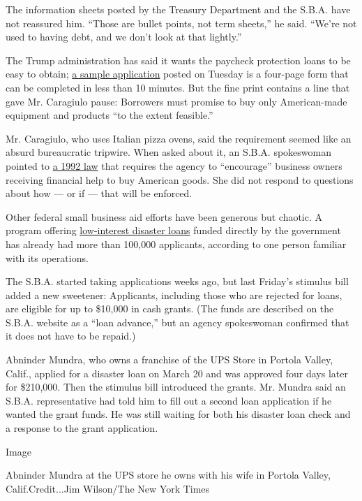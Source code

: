 The information sheets posted by the Treasury Department and the S.B.A.
have not reassured him. ``Those are bullet points, not term sheets,'' he
said. ``We're not used to having debt, and we don't look at that
lightly.''

The Trump administration has said it wants the paycheck protection loans
to be easy to obtain;
\href{https://www.sba.gov/sites/default/files/2020-03/Borrower\%20Paycheck\%20Protection\%20Program\%20Application_0.pdf}{a
sample application} posted on Tuesday is a four-page form that can be
completed in less than 10 minutes. But the fine print contains a line
that gave Mr. Caragiulo pause: Borrowers must promise to buy only
American-made equipment and products ``to the extent feasible.''

Mr. Caragiulo, who uses Italian pizza ovens, said the requirement seemed
like an absurd bureaucratic tripwire. When asked about it, an S.B.A.
spokeswoman pointed to
\href{https://www.congress.gov/bill/102nd-congress/house-bill/4111/text}{a
1992 law} that requires the agency to ``encourage'' business owners
receiving financial help to buy American goods. She did not respond to
questions about how --- or if --- that will be enforced.

Other federal small business aid efforts have been generous but chaotic.
A program offering
\href{https://www.nytimes3xbfgragh.onion/2020/08/03/business/small-business-loans-coronavirus.html}{low-interest
disaster loans} funded directly by the government has already had more
than 100,000 applicants, according to one person familiar with its
operations.

The S.B.A. started taking applications weeks ago, but last Friday's
stimulus bill added a new sweetener: Applicants, including those who are
rejected for loans, are eligible for up to \$10,000 in cash grants. (The
funds are described on the S.B.A. website as a ``loan advance,'' but an
agency spokeswoman confirmed that it does not have to be repaid.)

Abninder Mundra, who owns a franchise of the UPS Store in Portola
Valley, Calif., applied for a disaster loan on March 20 and was approved
four days later for \$210,000. Then the stimulus bill introduced the
grants. Mr. Mundra said an S.B.A. representative had told him to fill
out a second loan application if he wanted the grant funds. He was still
waiting for both his disaster loan check and a response to the grant
application.

Image

Abninder Mundra at the UPS store he owns with his wife in Portola
Valley, Calif.Credit...Jim Wilson/The New York Times

